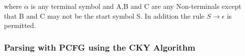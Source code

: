 where $\alpha$ is any terminal symbol and A,B and C are any Non-terminals except that B and C may not be the start symbol S.
In addition the rule $S \rightarrow \epsilon$ is permitted.
\cite[p.109]{sipser}







\subsubsection{Parsing with PCFG using the CKY Algorithm}




